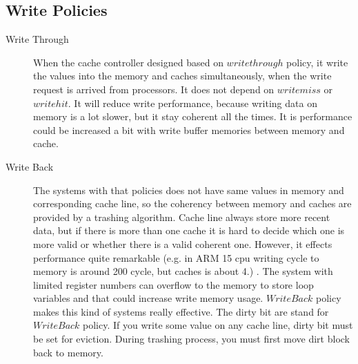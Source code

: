 \documentclass[informationsecurity]{gucmasterproject}
\begin{document}
\subsection*{Write Policies }
\begin{description}
\item[Write Through] When the cache controller designed based on $write through$ policy, it write the values into the memory and caches simultaneously, when the write request is arrived from processors. It does not depend on $write miss$ or $write hit$. It will reduce write performance, because writing data on memory is a lot slower, but it stay coherent all the times. It is performance could be increased a bit  with write buffer memories between memory and cache.
\item[Write Back] The systems with that policies does not have same values in memory and corresponding cache line, so the coherency between memory and caches are provided by a trashing algorithm. Cache line always store more recent data, but if there is more than one cache it is hard to decide which one is more valid or whether there is a valid coherent one.  However, it effects performance quite remarkable (e.g. in ARM 15 cpu writing cycle to memory is around 200 cycle, but caches is about 4.) . The system with limited register numbers can overflow to the memory to store loop variables and that could increase write memory usage. $Write Back$ policy makes this kind of systems really effective. The dirty bit are stand for $WriteBack$ policy. If you write some value on any cache line, dirty bit must be set for eviction. During trashing process, you must first move dirt block back to memory. 
\end{description}
\end{document}
